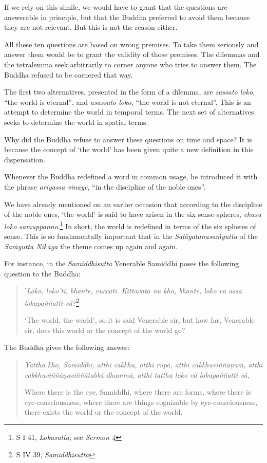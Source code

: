 If we rely on this simile, we would have to grant that the questions are answerable in principle, but that the Buddha preferred to avoid them because they are not relevant. But this is not the reason either.

All these ten questions are based on wrong premises. To take them seriously and answer them would be to grant the validity of those premises. The dilemmas and the tetralemma seek arbitrarily to corner anyone who tries to answer them. The Buddha refused to be cornered that way.

The first two alternatives, presented in the form of a dilemma, are \emph{sassato loko,} ``the world is eternal'', and \emph{asassato loko,} ``the world is not eternal''. This is an attempt to determine the world in temporal terms. The next set of alternatives seeks to determine the world in spatial terms.

Why did the Buddha refuse to answer these questions on time and space? It is because the concept of `the world' has been given quite a new definition in this dispensation.

Whenever the Buddha redefined a word in common usage, he introduced it with the phrase \emph{ariyassa vinaye}, ``in the discipline of the noble ones''.

We have already mentioned on an earlier occasion that according to the discipline of the noble ones, `the world' is said to have arisen in the six sense-spheres, \emph{chasu loko samuppanno}.\footnote{S I 41, \emph{Lokasutta}; see \emph{Sermon 4}} In short, the world is redefined in terms of the six spheres of sense. This is so fundamentally important that in the \emph{Saḷāyatanasaṁyutta} of the \emph{Saṁyutta Nikāya} the theme comes up again and again.

For instance, in the \emph{Samiddhisutta} Venerable Samiddhi poses the following question to the Buddha:

\begin{quote}
'\emph{Loko, loko'ti, bhante, vuccati. Kittāvatā nu kho, bhante, loko vā assa lokapaññatti vā?}\footnote{S IV 39, \emph{Samiddhisutta}}

`The world, the world', so it is said Venerable sir, but how far, Venerable sir, does this world or the concept of the world go?
\end{quote}

The Buddha gives the following answer:

\begin{quote}
\emph{Yattha kho, Samiddhi, atthi cakkhu, atthi rūpā, atthi cakkhuviññāṇaṁ, atthi cakkhuviññāṇaviññātabbā dhammā, atthi tattha loko vā lokapaññatti vā},

Where there is the eye, Samiddhi, where there are forms, where there is eye-consciousness, where there are things cognizable by eye-consciousness, there exists the world or the concept of the world.
\end{quote}

